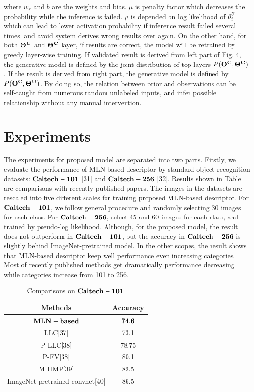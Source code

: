 \documentclass[journal]{IEEEtran}
\begin{document}
where $w_r$ and $b$ are the weights and bias. $\mu$ is penalty factor which decreases the probability while the inference is failed. $\mu$ is depended on log likelihood of $\theta^U_i$ which can lead to lower activation probability if inference result failed several times, and avoid system derives wrong results over again. 
On the other hand, for both $\bf{\Theta^U}$ and $\bf{\Theta^C}$ layer, if results are correct, the model will be retrained by greedy layer-wise training. If validated result is derived from left part of Fig. 4, the generative model is defined by the joint distribution of top layers $P(\bf{O^C} , \bf{\Theta^C})$. If the result is derived from right part, the generative model is defined by  $P(\bf{O^C} , \bf{\Theta^U})$. By doing so, the relation between prior and observations can be self-taught from numerous random unlabeled inputs, and infer possible relationship without any manual intervention.



\section{Experiments}
The experiments for proposed model are separated into two parts. Firstly, we evaluate the performance of MLN-based descriptor by standard object recognition datasets: $\bf{Caltech-101}$ [31] and $\bf{Caltech-256}$ [32]. Results shown in Table \uppercase\expandafter{} are comparisons with recently published papers. The images in the datasets are rescaled into five different scales for training proposed MLN-based descriptor. For $\bf{Caltech-101}$, we follow general procedure and randomly selecting 30 images for each class. For $\bf{Caltech-256}$, select 45 and 60 images for each class, and trained by pseudo-log likelihood. Although, for the proposed model, the result does not outperform in $\bf{Caltech-101}$, but the accuracy in $\bf{Caltech-256}$ is slightly behind ImageNet-pretrained model. In the other scopes, the result shows that MLN-based descriptor keep well performance even increasing categories. Most of recently published methods get dramatically performance decreasing while categories increase from 101 to 256. 


\begin{table}[!t]
\caption{Comparisons on $\bf{Caltech-101}$}
\begin{center}
\begin{tabular}{|c|c|}
\hline
Methods & Accuracy \\
\hline
$\bf{MLN-based}$ & $\bf{74.6}$ \\
\hline
LLC[37] & 73.1 \\
\hline
P-LLC[38] & 78.75\\
\hline
P-FV[38] & 80.1\\
\hline
M-HMP[39] & 82.5 \\
\hline
ImageNet-pretrained convnet[40] & 86.5 \\
\hline
\end{tabular}
\end{center}
\end{table}
\end{document}
